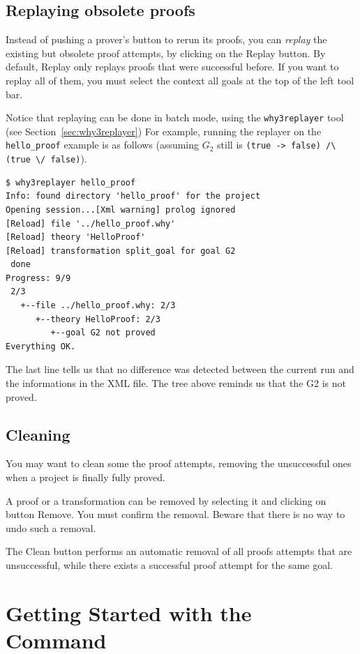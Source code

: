 \subsection{Replaying obsolete proofs}

Instead of pushing a prover's button to rerun its proofs, you can
\emph{replay} the existing but obsolete
proof attempts, by clicking on
the \textsf{Replay} button. By default, \textsf{Replay} only replays
proofs that were successful before. If you want to replay all of them,
you must select the context \textsf{all goals} at the top of the left
tool bar.

Notice that replaying can be done in batch mode, using the
\texttt{why3replayer} tool (see Section~\ref{sec:why3replayer}) For
example, running the replayer on the \texttt{hello\_proof} example is
as follows (assuming $G_2$ still is
\lstinline|(true -> false) /\ (true \/ false)|).
\begin{verbatim}
$ why3replayer hello_proof
Info: found directory 'hello_proof' for the project
Opening session...[Xml warning] prolog ignored
[Reload] file '../hello_proof.why'
[Reload] theory 'HelloProof'
[Reload] transformation split_goal for goal G2
 done
Progress: 9/9
 2/3
   +--file ../hello_proof.why: 2/3
      +--theory HelloProof: 2/3
         +--goal G2 not proved
Everything OK.
\end{verbatim}
The last line tells us that no difference was detected between the
current run and the informations in the XML file. The tree above
reminds us that the G2 is not proved.

\subsection{Cleaning}

You may want to clean some the proof attempts, \eg removing the
unsuccessful ones when a project is finally fully proved.

A proof or a transformation can be removed by selecting it and
clicking on button \textsf{Remove}. You must confirm the
removal. Beware that there is no way to undo such a removal.

The \textsf{Clean} button performs an automatic removal of all proofs
attempts that are unsuccessful, while there exists a successful proof
attempt for the same goal.

\section{Getting Started with the \why Command}
\label{sec:batch}

